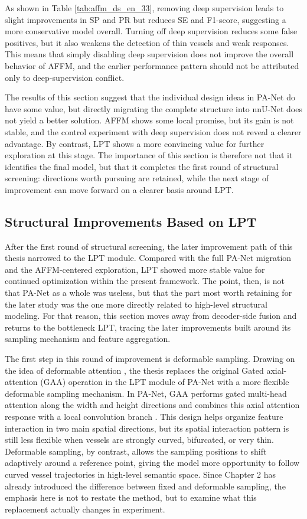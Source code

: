 \documentclass[a4paper,11pt]{article}
\begin{document}
As shown in Table \ref{tab:affm_ds_en_33}, removing deep supervision leads to slight improvements in SP and PR but reduces SE and F1-score, suggesting a more conservative model overall. Turning off deep supervision reduces some false positives, but it also weakens the detection of thin vessels and weak responses. This means that simply disabling deep supervision does not improve the overall behavior of AFFM, and the earlier performance pattern should not be attributed only to deep-supervision conflict.

The results of this section suggest that the individual design ideas in PA-Net do have some value, but directly migrating the complete structure into nnU-Net does not yield a better solution. AFFM shows some local promise, but its gain is not stable, and the control experiment with deep supervision does not reveal a clearer advantage. By contrast, LPT shows a more convincing value for further exploration at this stage. The importance of this section is therefore not that it identifies the final model, but that it completes the first round of structural screening: directions worth pursuing are retained, while the next stage of improvement can move forward on a clearer basis around LPT.

\subsection{Structural Improvements Based on LPT}
After the first round of structural screening, the later improvement path of this thesis narrowed to the LPT module. Compared with the full PA-Net migration and the AFFM-centered exploration, LPT showed more stable value for continued optimization within the present framework. The point, then, is not that PA-Net as a whole was useless, but that the part most worth retaining for the later study was the one more directly related to high-level structural modeling. For that reason, this section moves away from decoder-side fusion and returns to the bottleneck LPT, tracing the later improvements built around its sampling mechanism and feature aggregation.

The first step in this round of improvement is deformable sampling. Drawing on the idea of deformable attention \cite{zhu2021deformabledetr}, the thesis replaces the original Gated axial-attention (GAA) operation in the LPT module of PA-Net with a more flexible deformable sampling mechanism. In PA-Net, GAA performs gated multi-head attention along the width and height directions and combines this axial attention response with a local convolution branch \cite{luo2025panet}. This design helps organize feature interaction in two main spatial directions, but its spatial interaction pattern is still less flexible when vessels are strongly curved, bifurcated, or very thin. Deformable sampling, by contrast, allows the sampling positions to shift adaptively around a reference point, giving the model more opportunity to follow curved vessel trajectories in high-level semantic space. Since Chapter 2 has already introduced the difference between fixed and deformable sampling, the emphasis here is not to restate the method, but to examine what this replacement actually changes in experiment.
\end{document}
